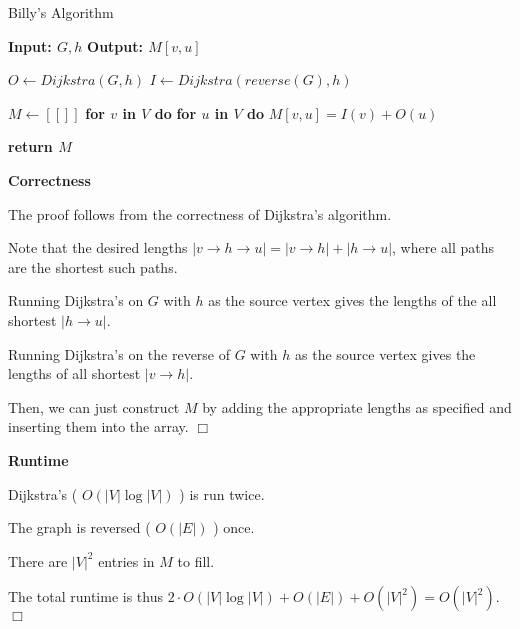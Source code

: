 \documentclass[10pt]{article}
\begin{document}
\begin{solution}

    \begin{algorithm}

        \caption{Billy's Algorithm}
        \begin{algorithmic}[1]
            
            \Statex \textbf{Input: $G, h$}
            \Statex \textbf{Output: $M[v, u]$}

            \State $O \gets Dijkstra(G, h)$
            \State $I \gets Dijkstra(reverse(G), h)$
            
            \State $M \gets [[]]$
            \State \textbf{for $v$ in $V$ do}
            \State \qquad \textbf{for $u$ in $V$ do}
            \State \qquad \qquad $M[v, u] = I(v) + O(u)$
            
            \State \textbf{return $M$}
        \end{algorithmic}

    \end{algorithm}

    \textbf{Correctness}

    The proof follows from the correctness of Dijkstra's algorithm. 

    Note that the desired lengths $| v \rightarrow h \rightarrow u | = 
    | v \rightarrow h | + | h \rightarrow u |$, where all paths are the shortest 
    such paths. 

    Running Dijkstra's on $G$ with $h$ as the source vertex gives the lengths 
    of the all shortest $| h \rightarrow u |$. 

    Running Dijkstra's on the reverse of $G$ with $h$ as the source vertex gives 
    the lengths of all shortest $| v \rightarrow h |$. 

    Then, we can just construct $M$ by adding the appropriate lengths as 
    specified and inserting them into the array. 
    $\Box$

    \textbf{Runtime}

    Dijkstra's (\: $O(|V|\log |V|)$ \:) is run twice. 

    The graph is reversed (\: $O(|E|)$ \:) once. 

    There are $|V|^2$ entries in $M$ to fill. 

    The total runtime is thus $2 \cdot O(|V|\log |V|) + O(|E|) + O(|V|^2) = O(|V|^2)$. 
    $\Box$

\end{solution}
\end{document}
